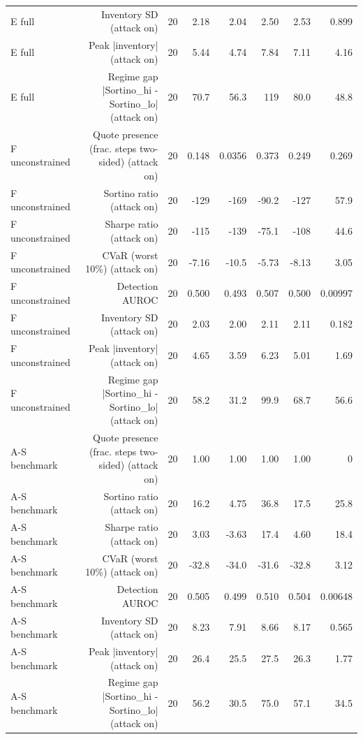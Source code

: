 \begin{table}[htbp]
\begin{tabular}{lrrrrrrr}
    E  full & Inventory SD (attack on) & 20 & 2.18 & 2.04 & 2.50 & 2.53 & 0.899 \\
    E  full & Peak |inventory| (attack on) & 20 & 5.44 & 4.74 & 7.84 & 7.11 & 4.16 \\
    E  full & Regime gap  |Sortino\_hi - Sortino\_lo| (attack on) & 20 & 70.7 & 56.3 & 119 & 80.0 & 48.8 \\
    F  unconstrained & Quote presence (frac. steps two-sided) (attack on) & 20 & 0.148 & 0.0356 & 0.373 & 0.249 & 0.269 \\
    F  unconstrained & Sortino ratio (attack on) & 20 & -129 & -169 & -90.2 & -127 & 57.9 \\
    F  unconstrained & Sharpe ratio (attack on) & 20 & -115 & -139 & -75.1 & -108 & 44.6 \\
    F  unconstrained & CVaR (worst 10\%) (attack on) & 20 & -7.16 & -10.5 & -5.73 & -8.13 & 3.05 \\
    F  unconstrained & Detection AUROC & 20 & 0.500 & 0.493 & 0.507 & 0.500 & 0.00997 \\
    F  unconstrained & Inventory SD (attack on) & 20 & 2.03 & 2.00 & 2.11 & 2.11 & 0.182 \\
    F  unconstrained & Peak |inventory| (attack on) & 20 & 4.65 & 3.59 & 6.23 & 5.01 & 1.69 \\
    F  unconstrained & Regime gap  |Sortino\_hi - Sortino\_lo| (attack on) & 20 & 58.2 & 31.2 & 99.9 & 68.7 & 56.6 \\
    A-S benchmark & Quote presence (frac. steps two-sided) (attack on) & 20 & 1.00 & 1.00 & 1.00 & 1.00 & 0 \\
    A-S benchmark & Sortino ratio (attack on) & 20 & 16.2 & 4.75 & 36.8 & 17.5 & 25.8 \\
    A-S benchmark & Sharpe ratio (attack on) & 20 & 3.03 & -3.63 & 17.4 & 4.60 & 18.4 \\
    A-S benchmark & CVaR (worst 10\%) (attack on) & 20 & -32.8 & -34.0 & -31.6 & -32.8 & 3.12 \\
    A-S benchmark & Detection AUROC & 20 & 0.505 & 0.499 & 0.510 & 0.504 & 0.00648 \\
    A-S benchmark & Inventory SD (attack on) & 20 & 8.23 & 7.91 & 8.66 & 8.17 & 0.565 \\
    A-S benchmark & Peak |inventory| (attack on) & 20 & 26.4 & 25.5 & 27.5 & 26.3 & 1.77 \\
    A-S benchmark & Regime gap  |Sortino\_hi - Sortino\_lo| (attack on) & 20 & 56.2 & 30.5 & 75.0 & 57.1 & 34.5 \\

\end{tabular}
\end{table}

